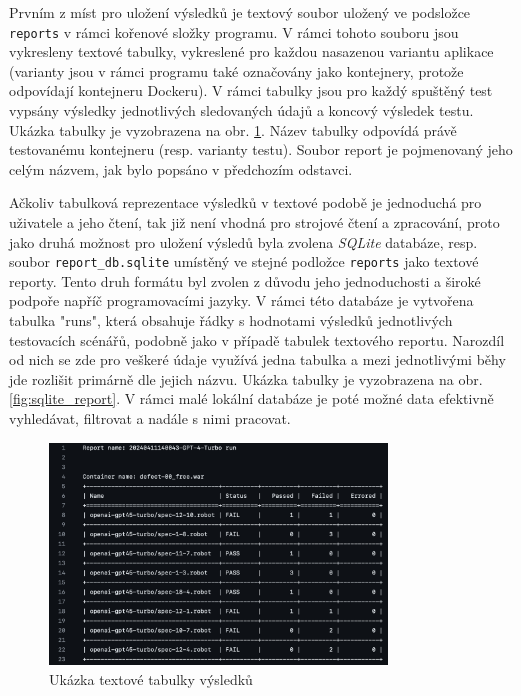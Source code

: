 \documentclass[czech, ma, kiv, he, iso690alph, pdf, viewonly]{fasthesis}
\begin{document}
    Prvním z míst pro uložení výsledků je textový soubor uložený ve podsložce \verb|reports| v rámci kořenové složky programu. V rámci tohoto souboru jsou vykresleny textové tabulky, vykreslené pro každou nasazenou variantu aplikace (varianty jsou v rámci programu také označovány jako kontejnery, protože odpovídají kontejneru Dockeru). V rámci tabulky jsou pro každý spuštěný test vypsány výsledky jednotlivých sledovaných údajů a koncový výsledek testu. Ukázka tabulky je vyzobrazena na obr. \ref{fig:report_table}. Název tabulky odpovídá právě testovanému kontejneru (resp. varianty testu). Soubor report je pojmenovaný jeho celým názvem, jak bylo popsáno v předchozím odstavci.

    Ačkoliv tabulková reprezentace výsledků v textové podobě je jednoduchá pro uživatele a jeho čtení, tak již není vhodná pro strojové čtení a zpracování, proto jako druhá možnost pro uložení výsledů byla zvolena \textit{SQLite} databáze, resp. soubor \verb|report_db.sqlite| umístěný ve stejné podložce \verb|reports| jako textové reporty. Tento druh formátu byl zvolen z důvodu jeho jednoduchosti a široké podpoře napříč programovacími jazyky. V rámci této databáze je vytvořena tabulka "runs", která obsahuje řádky s hodnotami výsledků jednotlivých testovacích scénářů, podobně jako v případě tabulek textového reportu. Narozdíl od nich se zde pro veškeré údaje využívá jedna tabulka a mezi jednotlivými běhy jde rozlišit primárně dle jejich názvu. Ukázka tabulky je vyzobrazena na obr. \ref{fig:sqlite_report}. V rámci malé lokální databáze je poté možné data efektivně vyhledávat, filtrovat a nadále s nimi pracovat.
   
    \begin{figure}
        \includegraphics[width=0.8\textwidth]{pic/report_table.png}
        \centering
        \caption{Ukázka textové tabulky výsledků}
        \label{fig:report_table}
    \end{figure}
\end{document}
